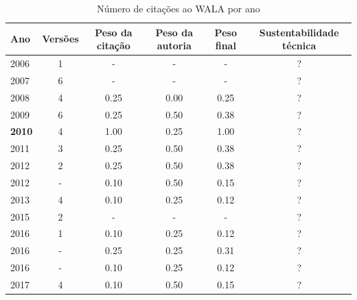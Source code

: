 \begin{table}[H]
\caption{Número de citações ao WALA por ano}
\centering
\begin{tabular}{| l | c | c | c | c | c |}
  \hline
  Ano & Versões & Peso da citação & Peso da autoria & Peso final & Sustentabilidade técnica \\
  \hline
        2006 & 1 & - & - & - & ? \\
\hline
        2007 & 6 & - & - & - & ? \\
\hline
            2008
          &
          4
          &
          0.25
          &
          0.00
          &
            {\color{red} 0.25}
          &
          ?
          \\
\hline
            2009
          &
          6
          &
          0.25
          &
          0.50
          &
            {\color{red} 0.38}
          &
          ?
          \\
\hline
            {\bf 2010}
          &
          4
          &
          1.00
          &
          0.25
          &
            {\color{blue} 1.00}
          &
          ?
          \\
\hline
            2011
          &
          3
          &
          0.25
          &
          0.50
          &
            {\color{red} 0.38}
          &
          ?
          \\
\hline
            2012
          &
          2
          &
          0.25
          &
          0.50
          &
            {\color{red} 0.38}
          &
          ?
          \\
            2012
          &
          -
          &
          0.10
          &
          0.50
          &
            {\color{red} 0.15}
          &
          ?
          \\
\hline
            2013
          &
          4
          &
          0.10
          &
          0.25
          &
            {\color{red} 0.12}
          &
          ?
          \\
\hline
        2015 & 2 & - & - & - & ? \\
\hline
            2016
          &
          1
          &
          0.10
          &
          0.25
          &
            {\color{red} 0.12}
          &
          ?
          \\
            2016
          &
          -
          &
          0.25
          &
          0.25
          &
            {\color{red} 0.31}
          &
          ?
          \\
            2016
          &
          -
          &
          0.10
          &
          0.25
          &
            {\color{red} 0.12}
          &
          ?
          \\
\hline
            2017
          &
          4
          &
          0.10
          &
          0.50
          &
            {\color{red} 0.15}
          &
          ?
          \\
\hline
\end{tabular}
\end{table}



